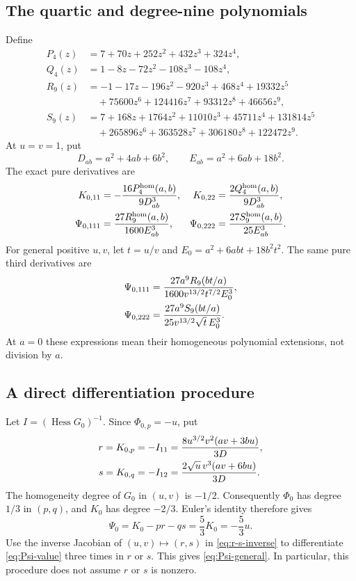 \documentclass[11pt,a4paper]{article}
\numberwithin{equation}{section}
\theoremstyle{remark}
\DeclareMathOperator{\Hess}{Hess}
\begin{document}
\subsection{The quartic and degree-nine polynomials}
Define
\begin{align*}
 P_4(z)&=7+70z+252z^2+432z^3+324z^4,\\
 Q_4(z)&=1-8z-72z^2-108z^3-108z^4,\\
 R_9(z)&=-1-17z-196z^2-920z^3+468z^4+19332z^5\\
       &\quad+75600z^6+124416z^7+93312z^8+46656z^9,\\
 S_9(z)&=7+168z+1764z^2+11010z^3+45711z^4+131814z^5\\
       &\quad+265896z^6+363528z^7+306180z^8+122472z^9.
\end{align*}
At $u=v=1$, put
\[
 D_{ab}=a^2+4ab+6b^2,\qquad E_{ab}=a^2+6ab+18b^2.
\]
The exact pure derivatives are
\begin{align}
 K_{0,11}&=-\frac{16P_4^{\rm hom}(a,b)}{9D_{ab}^3},
 &K_{0,22}&=\frac{2Q_4^{\rm hom}(a,b)}{9D_{ab}^3},
                    \label{eq:Kquartics}\\
 \Psi_{0,111}&=\frac{27R_9^{\rm hom}(a,b)}{1600E_{ab}^3},
 &\Psi_{0,222}&=\frac{27S_9^{\rm hom}(a,b)}{25E_{ab}^3}.
                    \label{eq:Psi-at-one}
\end{align}
For general positive $u,v$, let $t=u/v$ and
$E_0=a^2+6abt+18b^2t^2$. The same pure third derivatives are
\begin{align}
 \Psi_{0,111}
   &=\frac{27a^9 R_9(bt/a)}{1600v^{13/2}t^{7/2}E_0^3},\notag\\
 \Psi_{0,222}
   &=\frac{27a^9 S_9(bt/a)}{25v^{13/2}\sqrt t\,E_0^3}.
                  \label{eq:Psi-general}
\end{align}
At $a=0$ these expressions mean their homogeneous polynomial extensions,
not division by $a$.

\subsection{A direct differentiation procedure}
Let $I=(\Hess G_0)^{-1}$. Since $\Phi_{0,p}=-u$, put
\begin{align}
 r=K_{0,p}=-I_{11}
   &=\frac{8u^{3/2}v^2(av+3bu)}{3D},\notag\\
 s=K_{0,q}=-I_{12}
   &=\frac{2\sqrt u\,v^3(av+6bu)}{3D}.
                  \label{eq:r-s-inverse}
\end{align}
The homogeneity degree of $G_0$ in $(u,v)$ is $-1/2$. Consequently
$\Phi_0$ has degree $1/3$ in $(p,q)$, and $K_0$ has degree $-2/3$.
Euler's identity therefore gives
\begin{equation}\label{eq:Psi-value}
 \Psi_0=K_0-pr-qs=\frac53 K_0=-\frac53u.
\end{equation}
Use the inverse Jacobian of $(u,v)\mapsto(r,s)$ in
\eqref{eq:r-s-inverse} to differentiate \eqref{eq:Psi-value} three times
in $r$ or $s$. This gives \eqref{eq:Psi-general}. In particular, this
procedure does not assume $r$ or $s$ is nonzero.
\end{document}
